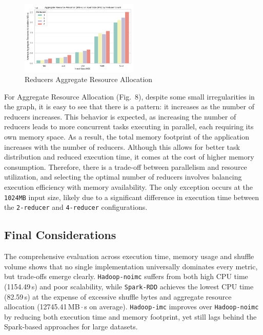 \begin{figure}[H]
	\centering
	\includegraphics[width=0.5\textwidth]{images/Fig_Reducers_Aggregate_Resource_Allocation.png}
	\caption{Reducers Aggregate Resource Allocation}
	\label{fig:reducer-aggregate-resource-allocation}
\end{figure}

For Aggregate Resource Allocation (Fig.~8), despite some small irregularities in the graph, it is easy to see that there is a pattern: it increases as the number of reducers increases. This behavior is expected, as increasing the number of reducers leads to more concurrent tasks executing in parallel, each requiring its own memory space. As a result, the total memory footprint of the application increases with the number of reducers. Although this allows for better task distribution and reduced execution time, it comes at the cost of higher memory consumption. Therefore, there is a trade-off between parallelism and resource utilization, and selecting the optimal number of reducers involves balancing execution efficiency with memory availability. The only exception occurs at the \texttt{1024MB} input size, likely due to a significant difference in execution time between the \texttt{2-reducer} and \texttt{4-reducer} configurations. 


\subsection{Final Considerations}
The comprehensive evaluation across execution time, memory usage and shuffle volume shows that no single implementation universally dominates every metric, but trade‑offs emerge clearly. \texttt{Hadoop-noimc} suffers from both high CPU time (1154.49\,s) and poor scalability, while \texttt{Spark-RDD} achieves the lowest CPU time (82.59\,s) at the expense of excessive shuffle bytes and aggregate resource allocation (12745.41\,MB\,$\cdot$\,s on average). \texttt{Hadoop-imc} improves over \texttt{Hadoop-noimc} by reducing both execution time and memory footprint, yet still lags behind the Spark-based approaches for large datasets.

